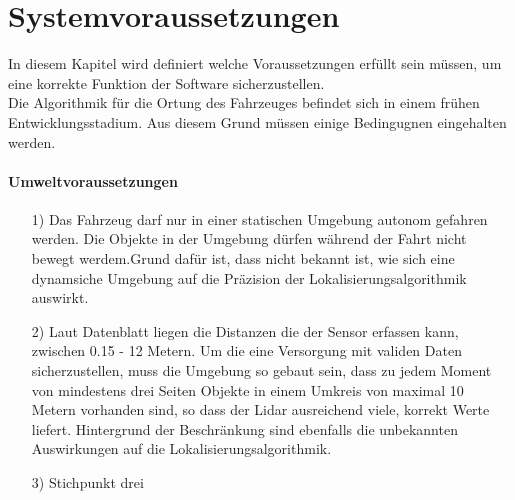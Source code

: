 \section{Systemvoraussetzungen}
In diesem Kapitel wird definiert welche Voraussetzungen erfüllt sein müssen, um eine korrekte Funktion der Software sicherzustellen.\\
Die Algorithmik für die Ortung des Fahrzeuges befindet sich in einem frühen Entwicklungsstadium. Aus diesem Grund müssen einige Bedingugnen eingehalten werden. 
\paragraph{Umweltvoraussetzungen}
\begin{itemize}
    \item[1)] Das Fahrzeug darf nur in einer statischen Umgebung autonom gefahren werden. Die Objekte in der Umgebung dürfen während der Fahrt nicht bewegt werdem.Grund dafür ist, dass nicht bekannt ist, wie sich eine dynamsiche Umgebung auf die Präzision der Lokalisierungsalgorithmik auswirkt. 
    \item[2)] Laut Datenblatt \cite{Slamtec2020} liegen die Distanzen die der Sensor erfassen kann, zwischen 0.15 - 12 Metern. Um die eine Versorgung mit validen Daten sicherzustellen, muss die Umgebung so gebaut sein, dass zu jedem Moment von mindestens drei Seiten Objekte in einem Umkreis von maximal 10 Metern vorhanden sind, so dass der Lidar ausreichend viele, korrekt Werte liefert.  Hintergrund der Beschränkung sind ebenfalls die unbekannten Auswirkungen auf die Lokalisierungsalgorithmik.
    \item[3)] Stichpunkt drei
\end{itemize}

